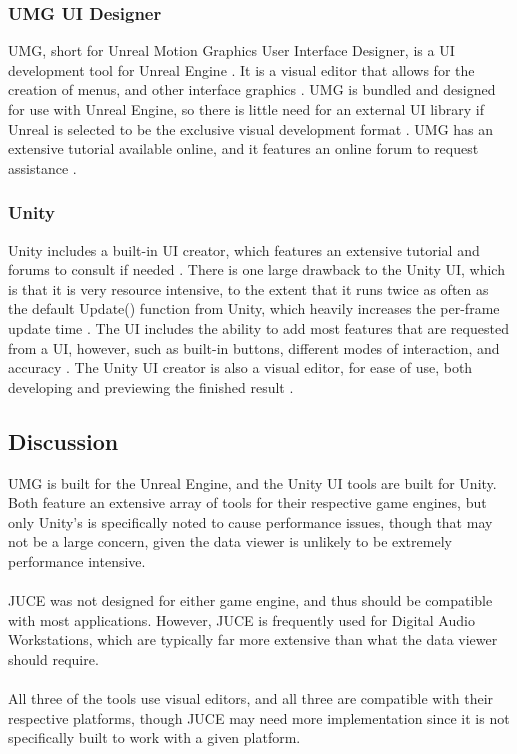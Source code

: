 \documentclass[onecolumn, draftclsnofoot,10pt, compsoc]{IEEEtran}
\begin{document}
\subsubsection{UMG UI Designer}
UMG, short for Unreal Motion Graphics User Interface Designer, is a UI development tool for Unreal Engine \cite{J2}. It is a visual editor that allows for the creation of menus, and other interface graphics \cite{J2}. UMG is bundled and designed for use with Unreal Engine, so there is little need for an external UI library if Unreal is selected to be the exclusive visual development format \cite{J2}. UMG has an extensive tutorial available online, and it features an online forum to request assistance \cite{J2}.


\subsubsection{Unity}
Unity includes a built-in UI creator, which features an extensive tutorial and forums to consult if needed \cite{J3}. There is one large drawback to the Unity UI, which is that it is very resource intensive, to the extent that it runs twice as often as the default Update() function from Unity, which heavily increases the per-frame update time \cite{J4}. The UI includes the ability to add most features that are requested from a UI, however, such as built-in buttons, different modes of interaction, and accuracy \cite{J3}. The Unity UI creator is also a visual editor, for ease of use, both developing and previewing the finished result \cite{J3}.

\subsection{Discussion}
UMG is built for the Unreal Engine, and the Unity UI tools are built for Unity. Both feature an extensive array of tools for their respective game engines, but only Unity's is specifically noted to cause performance issues, though that may not be a large concern, given the data viewer is unlikely to be extremely performance intensive. 
\\
\\
JUCE was not designed for either game engine, and thus should be compatible with most applications. However, JUCE is frequently used for Digital Audio Workstations, which are typically far more extensive than what the data viewer should require. 
\\
\\
All three of the tools use visual editors, and all three are compatible with their respective platforms, though JUCE may need more implementation since it is not specifically built to work with a given platform.
\end{document}
